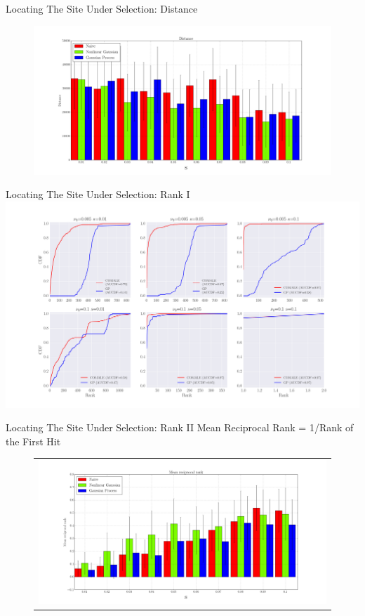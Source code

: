 \documentclass[t]{beamer} %
\begin{document}
\begin{frame}{Locating The Site Under Selection: Distance}
\begin{figure}[H]
  \centering
    \includegraphics[width=\textwidth]{dist}
\end{figure}
\end{frame}
\begin{frame}{Locating The Site Under Selection: Rank I}
  \includegraphics[scale=0.22]{rank}
\end{frame}
\begin{frame}{Locating The Site Under Selection: Rank II}
Mean Reciprocal Rank = 1/Rank of the First Hit
\begin{figure}[H]
  \centering
    \begin{tabular}{c}
  		    \includegraphics[width=\textwidth]{mrr}
  \end{tabular}
\end{figure}
\end{frame}
\end{document}
